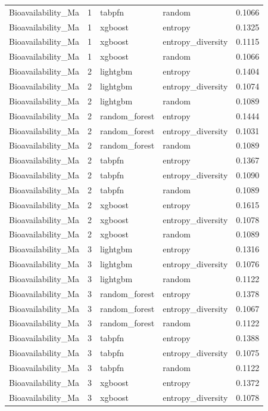 \begin{tabular}{lrllr}
Bioavailability_Ma & 1 & tabpfn & random & 0.1066 \\
Bioavailability_Ma & 1 & xgboost & entropy & 0.1325 \\
Bioavailability_Ma & 1 & xgboost & entropy_diversity & 0.1115 \\
Bioavailability_Ma & 1 & xgboost & random & 0.1066 \\
Bioavailability_Ma & 2 & lightgbm & entropy & 0.1404 \\
Bioavailability_Ma & 2 & lightgbm & entropy_diversity & 0.1074 \\
Bioavailability_Ma & 2 & lightgbm & random & 0.1089 \\
Bioavailability_Ma & 2 & random_forest & entropy & 0.1444 \\
Bioavailability_Ma & 2 & random_forest & entropy_diversity & 0.1031 \\
Bioavailability_Ma & 2 & random_forest & random & 0.1089 \\
Bioavailability_Ma & 2 & tabpfn & entropy & 0.1367 \\
Bioavailability_Ma & 2 & tabpfn & entropy_diversity & 0.1090 \\
Bioavailability_Ma & 2 & tabpfn & random & 0.1089 \\
Bioavailability_Ma & 2 & xgboost & entropy & 0.1615 \\
Bioavailability_Ma & 2 & xgboost & entropy_diversity & 0.1078 \\
Bioavailability_Ma & 2 & xgboost & random & 0.1089 \\
Bioavailability_Ma & 3 & lightgbm & entropy & 0.1316 \\
Bioavailability_Ma & 3 & lightgbm & entropy_diversity & 0.1076 \\
Bioavailability_Ma & 3 & lightgbm & random & 0.1122 \\
Bioavailability_Ma & 3 & random_forest & entropy & 0.1378 \\
Bioavailability_Ma & 3 & random_forest & entropy_diversity & 0.1067 \\
Bioavailability_Ma & 3 & random_forest & random & 0.1122 \\
Bioavailability_Ma & 3 & tabpfn & entropy & 0.1388 \\
Bioavailability_Ma & 3 & tabpfn & entropy_diversity & 0.1075 \\
Bioavailability_Ma & 3 & tabpfn & random & 0.1122 \\
Bioavailability_Ma & 3 & xgboost & entropy & 0.1372 \\
Bioavailability_Ma & 3 & xgboost & entropy_diversity & 0.1078 \\

\end{tabular}
